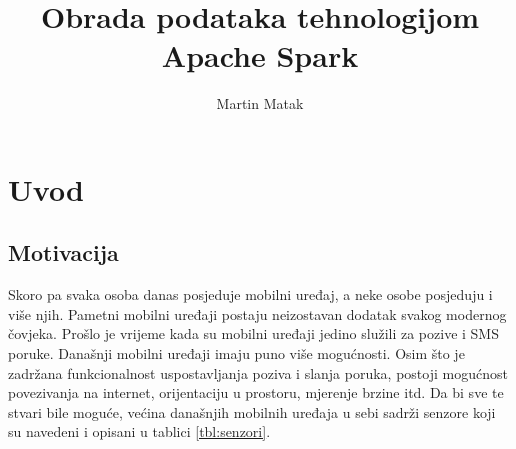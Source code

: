 \documentclass[times, utf8, zavrsni]{fer}
\begin{document}

\title{Obrada podataka tehnologijom Apache Spark}

\author{Martin Matak}

\maketitle



\tableofcontents

\chapter{Uvod}
\section{Motivacija}
Skoro pa svaka osoba danas posjeduje mobilni uređaj, a neke osobe posjeduju i više njih. Pametni mobilni uređaji postaju neizostavan dodatak svakog modernog čovjeka. Prošlo je vrijeme kada su mobilni uređaji jedino služili za pozive i SMS poruke. Današnji mobilni uređaji imaju puno više mogućnosti. Osim što je zadržana funkcionalnost uspostavljanja poziva i slanja poruka, postoji mogućnost povezivanja na internet, orijentaciju u prostoru, mjerenje brzine itd. Da bi sve te stvari bile moguće, većina današnjih mobilnih uređaja u sebi sadrži senzore koji su navedeni i opisani u tablici \ref{tbl:senzori}.
\end{document}
